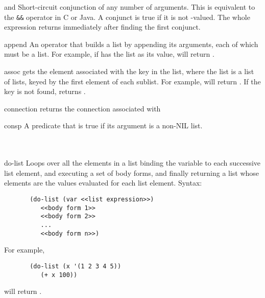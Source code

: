 \begin{okbcfspec}{and}
Short-circuit conjunction of any number of arguments.  This
is equivalent to the \verb|&&| operator in C or Java.  A
conjunct is true if it is not -valued.  The whole
 expression returns  immediately after
finding the first  conjunct.
\end{okbcfspec}

\begin{okbcfspec}{append}
An operator that builds a list by appending its arguments,
each of which must be a list.
For example, if  has the list  as its
value,  will return
.
\end{okbcfspec}

\begin{okbcfspec}{assoc}
 gets the element associated
with the key in the list, where the list is a list
of lists, keyed by the first element of each sublist.
For example, 
will return .  If the key is not found,
 returns .
\end{okbcfspec}

\begin{okbcfspec}{connection}
 returns the connection associated with
\end{okbcfspec}

\begin{okbcfspec}{consp}
A predicate that is true if its argument is a non-NIL list.\\
\\
\\
\end{okbcfspec}

\begin{okbcfspec}{do-list}
Loops over all the elements in a list binding the variable
 to each successive list element, and executing
a set of body forms, and finally returning a list whose
elements are the values evaluated for each list element.
Syntax:
\begin{verbatim}
       (do-list (var <<list expression>>)
          <<body form 1>>
          <<body form 2>>
          ...
          <<body form n>>)
\end{verbatim}
For example,
\begin{verbatim}
       (do-list (x '(1 2 3 4 5))
          (+ x 100))
\end{verbatim}
will return .
\end{okbcfspec}

